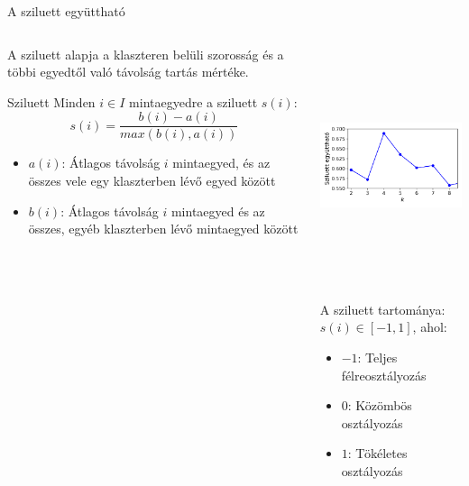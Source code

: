 \documentclass[english, aspectratio=169]{beamer}
\begin{document}
\begin{frame}{A sziluett együttható}
\begin{columns}
\begin{column}{.5\textwidth}
A sziluett alapja a klaszteren belüli szorosság és a többi egyedtől való távolság tartás mértéke.\par\smallskip
\begin{block}{Sziluett}
Minden $i \in I$ mintaegyedre a sziluett $s\left( i \right)$:
\vspace{-.2cm}
\[
s\left( i \right) = \frac{b\left( i \right) - a\left( i \right)}{max\left( b\left( i \right), a\left( i \right) \right)}
\]
\vspace{-.4cm}
\begin{itemize}
	\item $a\left( i \right)$: Átlagos távolság $i$ mintaegyed, és az összes vele egy klaszterben lévő egyed között
	\item $b\left( i \right)$: Átlagos távolság $i$ mintaegyed és az összes, egyéb klaszterben lévő mintaegyed között
\end{itemize}
\end{block}
\end{column}
\begin{column}{.5\textwidth}
\begin{center}
\includegraphics[width=7cm, height=7cm, keepaspectratio]{images/unsupervised_31.png}
\end{center}
A sziluett tartománya: $s\left( i \right) \in \left[ -1, 1 \right]$, ahol:
\vspace{-.3cm}
\begin{itemize}
	\item $-1$: Teljes félreosztályozás
	\item $0$: Közömbös osztályozás
	\item $1$: Tökéletes osztályozás
\end{itemize}
\end{column}
\end{columns}
\end{frame}
\end{document}
